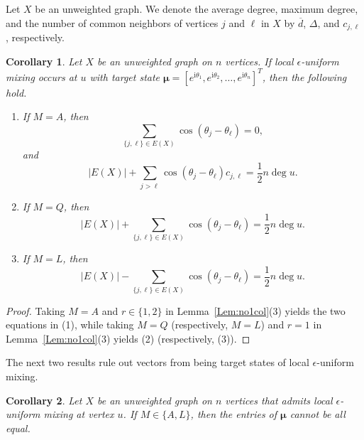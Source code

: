 \documentclass[11pt]{article}
\newtheorem{corollary}{Corollary}
\newcommand{\bmu}{{\boldsymbol{\mu}}}
\def\ii{\mathrm{i}}
\begin{document}
Let $X$ be an unweighted graph.
We denote the average degree, maximum degree, and the number of common neighbors of vertices $j$ and $\ell$ in $X$ by $\overline{d}$, $\Delta$, and $c_{j,\ell}$, respectively.

\begin{corollary}
\label{Cor:eqs}
Let $X$ be an unweighted graph on $n$ vertices. If local $\epsilon$-uniform mixing occurs at $u$ with target state $\bmu=[e^{\ii \theta_1},e^{\ii \theta_2},\ldots,e^{\ii \theta_{n}}]^T$, then the following hold.
\begin{enumerate}
\item If $M=A$, then
\begin{equation}
\label{Eq:cos}
\sum_{\{j,\ell\}\in E(X)}\cos(\theta_j-\theta_{\ell})=0,
\end{equation}
and
\begin{equation}
\label{Eq:cos1}
|E(X)|+\sum_{j>\ell}\cos(\theta_j-\theta_{\ell})c_{j,\ell}=\frac{1}{2}n\operatorname{deg}u.
\end{equation}
\item If $M=Q$, then
\begin{equation}
\label{Eq:cosQ}
|E(X)|+\sum_{\{j,\ell\}\in E(X)}\cos(\theta_j-\theta_{\ell})=\frac{1}{2}n\operatorname{deg}u.
\end{equation}
\item If $M=L$, then
\begin{equation}
\label{Eq:cosL}
|E(X)|-\sum_{\{j,\ell\}\in E(X)}\cos(\theta_j-\theta_{\ell})=\frac{1}{2}n\operatorname{deg}u.
\end{equation}
\end{enumerate}
\end{corollary}

\begin{proof}
Taking $M=A$ and $r\in\{1,2\}$ in Lemma~\ref{Lem:no1col}(3) yields the two equations in (1), while taking $M=Q$ (respectively, $M=L$) and $r=1$ in Lemma~\ref{Lem:no1col}(3) yields (2) (respectively, (3)).   
\end{proof}

The next two results rule out vectors from being target states of local $\epsilon$-uniform mixing.

\begin{corollary}
\label{no1}
Let $X$ be an unweighted graph on $n$ vertices that admits local $\epsilon$-uniform mixing at vertex $u$. If $M\in\{A,L\}$, then the entries of $\bmu$ cannot be all equal.
\end{corollary}
\end{document}

